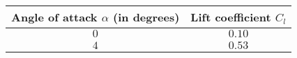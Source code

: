 \begin{tabular}[12pt]{ |c| c| }
\hline
Angle of attack $\alpha$ (in degrees) & Lift coefficient $C_l$ \\
\hline
$0$ & $0.10$ \\
\hline
$4$ & $0.53$ \\
\hline
\end{tabular}
